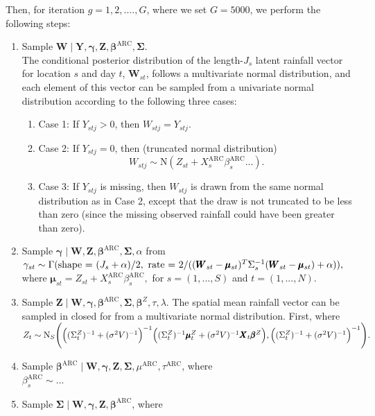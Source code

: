 \documentclass[12pt]{article}
\def\bbeta{\pmb{\beta}}
\def\bgamma{\pmb{\gamma}}
\def\bmu{\pmb{\mu}}
\def\bSigma{\pmb{\Sigma}}
\def\bX{\pmb{X}}
\def\bY{\pmb{Y}}
\def\bZ{\pmb{Z}}
\def\bW{\pmb{W}}
\begin{document}
Then, for iteration $g = 1, 2, ...., G$, where we set $G = 5000$, we perform the following steps:
\begin{enumerate}
\item Sample $\bW \mid \bY, \bgamma, \bZ, \bbeta^\text{ARC}, \bSigma$.\\
The conditional posterior distribution of the length-$J_s$ latent rainfall vector for location $s$ and day $t$, $\bW_{st}$, follows a multivariate normal distribution, and each element of this vector can be sampled from a univariate normal distribution according to the following three cases:
\begin{enumerate}
\item Case 1: If $Y_{stj} > 0$, then $W_{stj} = Y_{stj}$.
\item Case 2: If $Y_{stj} = 0$, then (truncated normal distribution)
$$
W_{stj} \sim \text{N}(Z_{st} + X_{s}^\text{ARC}\beta_s^\text{ARC} ...).
$$
\item Case 3: If $Y_{stj}$ is missing, then $W_{stj}$ is drawn from the same normal distribution as in Case 2, except that the draw is not truncated to be less than zero (since the missing observed rainfall could have been greater than zero).
\end{enumerate}
\item Sample $\bgamma \mid \bW, \bZ, \bbeta^\text{ARC}, \bSigma, \alpha$ from \\
$
\gamma_{st} \sim \Gamma(\text{shape = }(J_s + \alpha)/2, \text{ rate = }2/((\bW_{st} - \bmu_{st})^T\Sigma_s^{-1}(\bW_{st} - \bmu_{st}) + \alpha)),\\
$ where
$
\bmu_{st} = Z_{st} + X_{s}^\text{ARC}\beta_s^\text{ARC},
$
for $s = (1, ..., S)$ and $t = (1, ..., N)$.
\item Sample $\bZ \mid \bW, \bgamma, \bbeta^\text{ARC}, \bSigma, \bbeta^Z, \tau, \lambda$. The spatial mean rainfall vector can be sampled in closed for from a multivariate normal distribution. First, where \\
$
Z_t \sim \text{N}_S\Biggl(\Bigl((\Sigma_t^Z)^{-1} + (\sigma^2V)^{-1}\Bigr)^{-1}\Bigl((\Sigma_t^Z)^{-1}\bmu_t^Z + (\sigma^2V)^{-1}\bX_t\bbeta^Z\Bigr), \Bigl((\Sigma_t^Z)^{-1} + (\sigma^2V)^{-1}\Bigr)^{-1}\Biggr).
$
\item Sample $\bbeta^\text{ARC} \mid \bW, \bgamma, \bZ, \bSigma, \mu^\text{ARC}, \tau^\text{ARC}$, where \\
$
\beta_s^\text{ARC} \sim ...
$
\item Sample $\bSigma \mid \bW, \bgamma, \bZ, \bbeta^\text{ARC}$, where \\

\end{enumerate}
\end{document}
